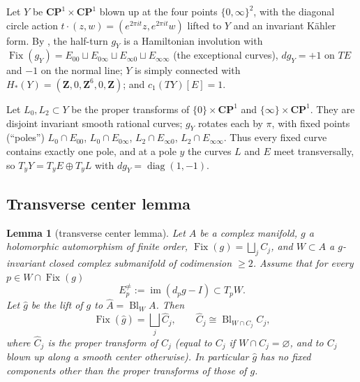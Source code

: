 \documentclass[11pt]{amsart}
\numberwithin{equation}{section}
\newtheorem{lemma}[theorem]{Lemma}
\theoremstyle{definition}
\theoremstyle{remark}
\newcommand{\CP}{\mathbf{CP}}
\newcommand{\Z}{\mathbf Z}
\DeclareMathOperator{\Fix}{Fix}
\DeclareMathOperator{\Bl}{Bl}
\begin{document}
Let $Y$ be $\CP^1\times\CP^1$ blown up at the four points
$\{0,\infty\}^2$, with the diagonal circle action
$t\cdot(z,w)=(e^{2\pi it}z,e^{2\pi it}w)$ lifted to $Y$ and an invariant
K\"ahler form. By \cite[Prop.~4.3]{OpenAI22}, the half-turn $g_Y$ is a
Hamiltonian involution with $\Fix(g_Y)=E_{00}\sqcup E_{0\infty}\sqcup
E_{\infty0}\sqcup E_{\infty\infty}$ (the exceptional curves), $dg_Y=+1$ on
$TE$ and $-1$ on the normal line; $Y$ is simply connected with
$H_*(Y)=(\Z,0,\Z^6,0,\Z)$; and $c_1(TY)[E]=1$.

Let $L_0,L_2\subset Y$ be the proper transforms of $\{0\}\times\CP^1$ and
$\{\infty\}\times\CP^1$. They are disjoint invariant smooth rational
curves; $g_Y$ rotates each by $\pi$, with fixed points (``poles'')
$L_0\cap E_{00}$, $L_0\cap E_{0\infty}$, $L_2\cap E_{\infty0}$,
$L_2\cap E_{\infty\infty}$. Thus every fixed curve contains exactly one
pole, and at a pole $y$ the curves $L$ and $E$ meet transversally, so
$T_yY=T_yE\oplus T_yL$ with $dg_Y=\operatorname{diag}(1,-1)$.

\subsection{Transverse center lemma}

\begin{lemma}[transverse center lemma]\label{lem:transverse}
Let $A$ be a complex manifold, $g$ a holomorphic automorphism of finite
order, $\Fix(g)=\bigsqcup_jC_j$, and $W\subset A$ a $g$-invariant closed
complex submanifold of codimension $\ge2$. Assume that for every
$p\in W\cap\Fix(g)$
\begin{equation}\label{eq:transverse}
  E_p^{\ne}:=\operatorname{im}(d_pg-I)\subset T_pW .
\end{equation}
Let $\hat g$ be the lift of $g$ to $\widehat A=\Bl_WA$. Then
\[
  \Fix(\hat g)=\bigsqcup_j\widehat C_j,\qquad
  \widehat C_j\cong\Bl_{W\cap C_j}C_j ,
\]
where $\widehat C_j$ is the proper transform of $C_j$ (equal to $C_j$ if
$W\cap C_j=\varnothing$, and to $C_j$ blown up along a smooth center
otherwise). In particular $\hat g$ has no fixed components other than the
proper transforms of those of $g$.
\end{lemma}
\end{document}
